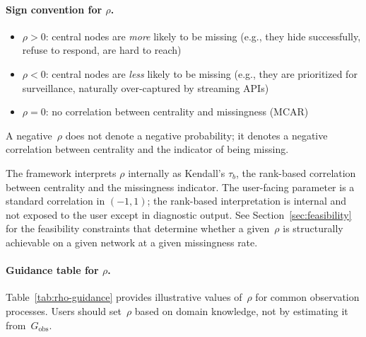 \documentclass[11pt]{article}
\newcommand{\Gobs}{G_{\text{obs}}}
\begin{document}
\paragraph{Sign convention for $\rho$.}
\begin{itemize}[leftmargin=*, itemsep=2pt]
  \item $\rho > 0$: central nodes are \emph{more} likely to be missing (e.g., they hide successfully, refuse to respond, are hard to reach)
  \item $\rho < 0$: central nodes are \emph{less} likely to be missing (e.g., they are prioritized for surveillance, naturally over-captured by streaming APIs)
  \item $\rho = 0$: no correlation between centrality and missingness (MCAR)
\end{itemize}
A negative~$\rho$ does not denote a negative probability; it denotes a negative correlation between centrality and the indicator of being missing.

The framework interprets $\rho$ internally as Kendall's $\tau_b$, the rank-based correlation between centrality and the missingness indicator. The user-facing parameter is a standard correlation in $(-1, 1)$; the rank-based interpretation is internal and not exposed to the user except in diagnostic output. See Section~\ref{sec:feasibility} for the feasibility constraints that determine whether a given~$\rho$ is structurally achievable on a given network at a given missingness rate.

\paragraph{Guidance table for $\rho$.} Table~\ref{tab:rho-guidance} provides illustrative values of~$\rho$ for common observation processes. Users should set~$\rho$ based on domain knowledge, not by estimating it from~$\Gobs$.
\end{document}
